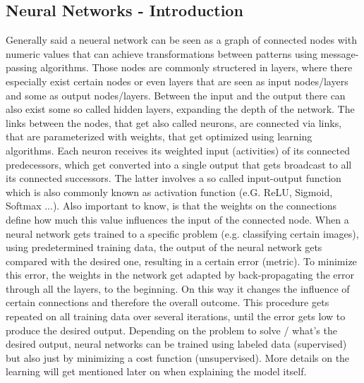 \subsection{Neural Networks - Introduction}
Generally said a neueral network can be seen as a graph of connected nodes  with numeric values that can achieve transformations between patterns using message-passing algorithms. \cite{Jordan1996neuralnets} Those nodes are commonly structered in layers, where there especially exist certain nodes or even layers that are seen as input nodes/layers and some as output nodes/layers. Between the input and the output there can also exist some so called hidden layers, expanding the depth of the network. The links between the nodes, that get also called neurons, are connected via links, that are parameterized with weights, that get optimized using learning algorithms. Each neuron receives its weighted input (activities) of its connected predecessors, which get converted into a single output that gets broadcast to all its connected successors. \cite{hinton1992neural} The latter involves a so called input-output function which is also commonly known as activation function (e.G. ReLU, Sigmoid, Softmax ...). Also important to know, is that the weights on the connections define how much this value influences the input of the connected node. 
When a neural network gets trained to a specific problem (e.g. classifying certain images), using predetermined training data, the output of the neural network gets compared with the desired one, resulting in a certain error (metric). To minimize this error, the weights in the network get adapted by back-propagating the error through all the layers, to the beginning. On this way it changes the influence of certain connections and therefore the overall outcome. This procedure gets repeated on all training data over several iterations, until the error gets low to produce the desired output. Depending on the problem to solve / what's the desired output, neural networks can be trained using labeled data (supervised) but also just by minimizing a cost function (unsupervised).\cite{oshea2015introductionConv} More details on the learning will get mentioned later on when explaining the model itself. 

